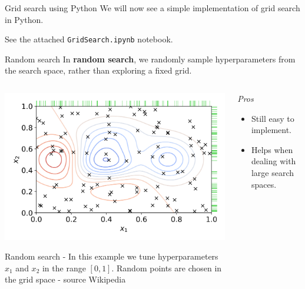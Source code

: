 \documentclass[9pt, aspectratio=169]{beamer}
\begin{document}
\begin{frame}
    {Grid search using Python}
    We will now see a simple implementation of grid search in Python.

    See the attached \texttt{GridSearch.ipynb} notebook.
\end{frame}

\begin{frame}
    {Random search}
    In \textbf{random search}, we randomly sample hyperparameters from the search space, rather than exploring a fixed grid.

    \begin{columns}
        \begin{column}{0.5\textwidth}
            \centering
            \includegraphics[width=\textwidth]{randomsearch.png}

            \footnotesize
            Random search - In this example we tune hyperparameters $x_1$ and $x_2$ in the range $[0,1]$. Random points are chosen in the grid space - source Wikipedia
        \end{column}
        \begin{column}{.5\textwidth}
            {
                \textit{Pros}
                \begin{itemize}
                    \item Still easy to implement.
                    \item Helps when dealing with large search spaces.
                \end{itemize}
            }
        \end{column}
    \end{columns}
\end{frame}
\end{document}
